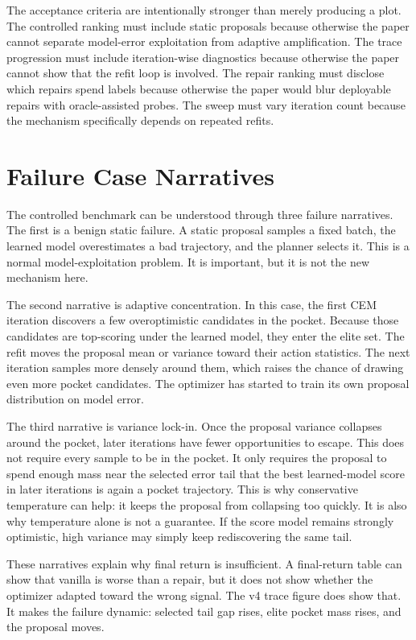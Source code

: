 The acceptance criteria are intentionally stronger than merely producing a
plot. The controlled ranking must include static proposals because otherwise
the paper cannot separate model-error exploitation from adaptive
amplification. The trace progression must include iteration-wise diagnostics
because otherwise the paper cannot show that the refit loop is involved. The
repair ranking must disclose which repairs spend labels because otherwise the
paper would blur deployable repairs with oracle-assisted probes. The sweep
must vary iteration count because the mechanism specifically depends on
repeated refits.

\section{Failure Case Narratives}
\label{app:failure-narratives}

The controlled benchmark can be understood through three failure narratives.
The first is a benign static failure. A static proposal samples a fixed batch,
the learned model overestimates a bad trajectory, and the planner selects it.
This is a normal model-exploitation problem. It is important, but it is not the
new mechanism here.

The second narrative is adaptive concentration. In this case, the first CEM
iteration discovers a few overoptimistic candidates in the pocket. Because
those candidates are top-scoring under the learned model, they enter the elite
set. The refit moves the proposal mean or variance toward their action
statistics. The next iteration samples more densely around them, which raises
the chance of drawing even more pocket candidates. The optimizer has started
to train its own proposal distribution on model error.

The third narrative is variance lock-in. Once the proposal variance collapses
around the pocket, later iterations have fewer opportunities to escape. This
does not require every sample to be in the pocket. It only requires the
proposal to spend enough mass near the selected error tail that the best
learned-model score in later iterations is again a pocket trajectory. This is
why conservative temperature can help: it keeps the proposal from collapsing
too quickly. It is also why temperature alone is not a guarantee. If the score
model remains strongly optimistic, high variance may simply keep rediscovering
the same tail.

These narratives explain why final return is insufficient. A final-return
table can show that vanilla \cem{} is worse than a repair, but it does not show
whether the optimizer adapted toward the wrong signal. The v4 trace figure
does show that. It makes the failure dynamic: selected tail gap rises, elite
pocket mass rises, and the proposal moves.

